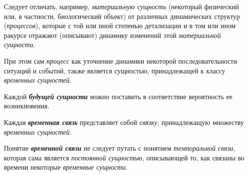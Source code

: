 \begin{SCn}
\begin{SCn}
Следует отличать, например, \textit{материальную сущность} (некоторый физический или, в частности, биологический объект) от различных динамических структур (\textit{процессов}), которые с той или иной степенью детализации и в том или ином ракурсе отражают (описывают) динамику изменений этой \textit{материальной сущности}. 
			
При этом сам \textit{процесс} как уточнение динамики некоторой последовательности ситуаций и событий, также является сущностью, принадлежащей к классу \textit{временных сущностей}.
		
\begin{SCn}

\bigskip
\bigskip
{}
		
\end{SCn}

Каждой \textbf{\textit{будущей сущности}} можно поставить в соответствие вероятность ее возникновения.
	
\begin{SCn}
\end{SCn}

Каждая \textbf{\textit{временная связь}} представляет собой \textit{связку}, принадлежащую множеству \textit{временных сущностей}.
			
Понятие \textbf{\textit{временной связи}} не следует путать с понятием \textit{темпоральной связи}, которая сама является \textit{постоянной сущностью}, описывающей то, как связаны во времени некоторые \textit{временные сущности}.

\begin{SCn}
\end{SCn}


\end{SCn}
\end{SCn}
